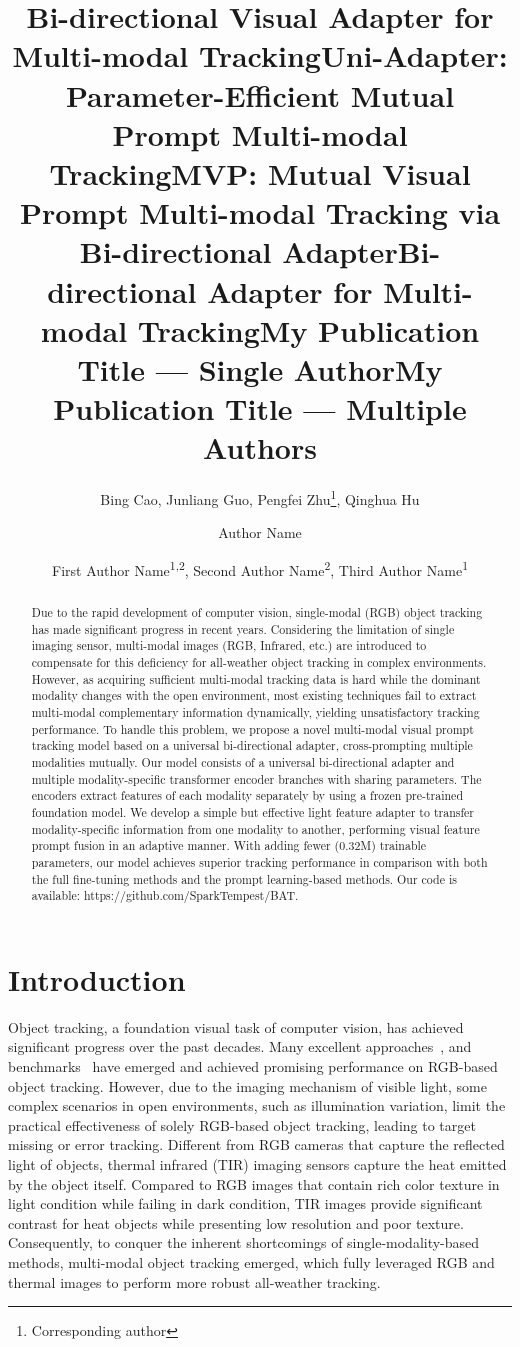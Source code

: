 \documentclass[letterpaper]{article} %
\title{Bi-directional Visual Adapter for Multi-modal Tracking}
\title{Uni-Adapter: }
\title{Parameter-Efficient Mutual Prompt Multi-modal Tracking}
\title{MVP: Mutual Visual Prompt Multi-modal Tracking via Bi-directional Adapter}
\title{Bi-directional Adapter for Multi-modal Tracking}
\author{
    Bing Cao,
    Junliang Guo,
    Pengfei Zhu\thanks{Corresponding author},
    Qinghua Hu
}
\title{My Publication Title --- Single Author}
\author {
    Author Name
}
\title{My Publication Title --- Multiple Authors}
\author {
    First Author Name\textsuperscript{\rm 1,\rm 2},
    Second Author Name\textsuperscript{\rm 2},
    Third Author Name\textsuperscript{\rm 1}
}
\begin{document}
\maketitle


\begin{abstract}
Due to the rapid development of computer vision, single-modal (RGB) object tracking has made significant progress in recent years. Considering the limitation of single imaging sensor, multi-modal images (RGB, Infrared, etc.) are introduced to compensate for this deficiency for all-weather object tracking in complex environments. However, as acquiring sufficient multi-modal tracking data is hard while the dominant modality changes with the open environment, most existing techniques fail to extract multi-modal complementary information dynamically, yielding unsatisfactory tracking performance. To handle this problem, we propose a novel multi-modal visual prompt tracking model based on a universal bi-directional adapter, cross-prompting multiple modalities mutually. Our model consists of a universal bi-directional adapter and multiple modality-specific transformer encoder branches with sharing parameters. The encoders extract features of each modality separately by using a frozen pre-trained foundation model. We develop a simple but effective light feature adapter to transfer modality-specific information from one modality to another, performing visual feature prompt fusion in an adaptive manner. With adding fewer (0.32M) trainable parameters, our model achieves superior tracking performance in comparison with both the full fine-tuning methods and the prompt learning-based methods. Our code is available: https://github.com/SparkTempest/BAT.


\end{abstract}

\section{Introduction}

Object tracking, a foundation visual task of computer vision, has achieved significant progress over the past decades. Many excellent approaches~\cite{JMMC,ProTrack,ADRNet,DMCNet,zhu2023visual}, and benchmarks~\cite{GTOT,rgbt234,LasHeR,HMFT} have emerged and achieved promising performance on RGB-based object tracking.
However, due to the imaging mechanism of visible light, some complex scenarios in open environments, such as illumination variation, limit the practical effectiveness of solely RGB-based object tracking, leading to target missing or error tracking.
Different from RGB cameras that capture the reflected light of objects, thermal infrared (TIR) imaging sensors capture the heat emitted by the object itself.
Compared to RGB images that contain rich color texture in light condition while failing in dark condition,  TIR images provide significant contrast for heat objects while presenting low resolution and poor texture.
Consequently, to conquer the inherent shortcomings of single-modality-based methods, multi-modal object tracking emerged, which fully leveraged RGB and thermal images to perform more robust all-weather tracking.
\end{document}
